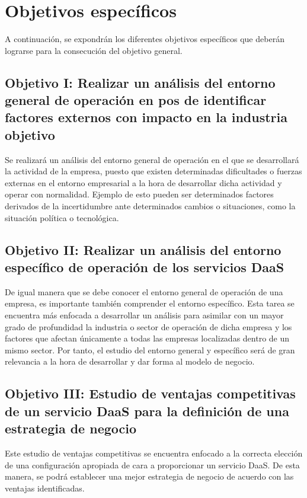 \clearpage

\section{Objetivos específicos}
A continuación, se expondrán los diferentes objetivos específicos que deberán lograrse para la consecución del objetivo general.

\subsection{Objetivo I: Realizar un análisis del entorno general de operación en pos de identificar factores externos con impacto en la industria objetivo}
Se realizará un análisis del entorno general de operación en el que se desarrollará la actividad de la empresa, puesto que existen determinadas dificultades o fuerzas externas en el entorno empresarial a la hora de desarrollar dicha actividad y operar con normalidad. Ejemplo de esto pueden ser determinados factores derivados de la incertidumbre ante determinados cambios o situaciones, como la situación política o tecnológica.


\subsection{Objetivo II: Realizar un análisis del entorno específico de operación de los servicios \acs{DaaS}}
De igual manera que se debe conocer el entorno general de operación de una empresa, es importante también comprender el entorno específico. Esta tarea se encuentra más enfocada a desarrollar un análisis para asimilar con un mayor grado de profundidad la industria o sector de operación de dicha empresa y los factores que afectan únicamente a todas las empresas localizadas dentro de un mismo sector. Por tanto, el estudio del entorno general y específico será de gran relevancia a la hora de desarrollar y dar forma al modelo de negocio.

\subsection{Objetivo III: Estudio de ventajas competitivas de un servicio \acs{DaaS} para la definición de una estrategia de negocio}
Este estudio de ventajas competitivas se encuentra enfocado a la correcta elección de una configuración apropiada de cara a proporcionar un servicio \acs{DaaS}. De esta manera, se podrá establecer una mejor estrategia de negocio de acuerdo con las ventajas identificadas.

